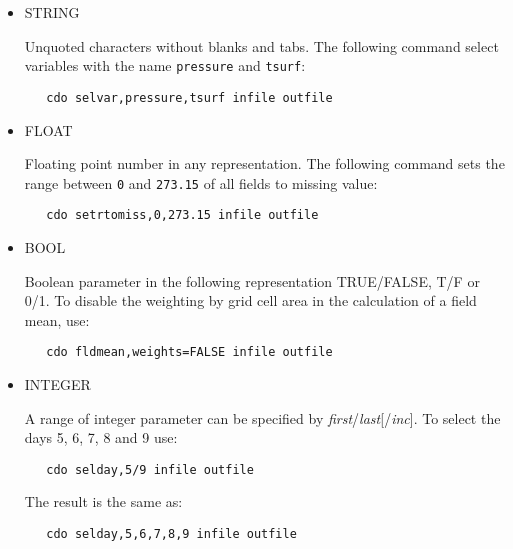 \begin{itemize}
\item STRING

Unquoted characters without blanks and tabs.
The following command select variables with the name \texttt{pressure} and \texttt{tsurf}:
\begin{verbatim}
   cdo selvar,pressure,tsurf infile outfile
\end{verbatim}

\item FLOAT

Floating point number in any representation.
The following command sets the range between \texttt{0} and \texttt{273.15}
of all fields to missing value:
\begin{verbatim}
   cdo setrtomiss,0,273.15 infile outfile
\end{verbatim}

\item BOOL

Boolean parameter in the following representation TRUE/FALSE, T/F or 0/1.
To disable the weighting by grid cell area in the calculation of a field mean, use:
\begin{verbatim}
   cdo fldmean,weights=FALSE infile outfile
\end{verbatim}

\item INTEGER

A range of integer parameter can be specified by \textit{first}/\textit{last}[/\textit{inc}].
To select the days 5, 6, 7, 8 and 9 use:
\begin{verbatim}
   cdo selday,5/9 infile outfile
\end{verbatim}
The result is the same as:
\begin{verbatim}
   cdo selday,5,6,7,8,9 infile outfile
\end{verbatim}
\end{itemize}



